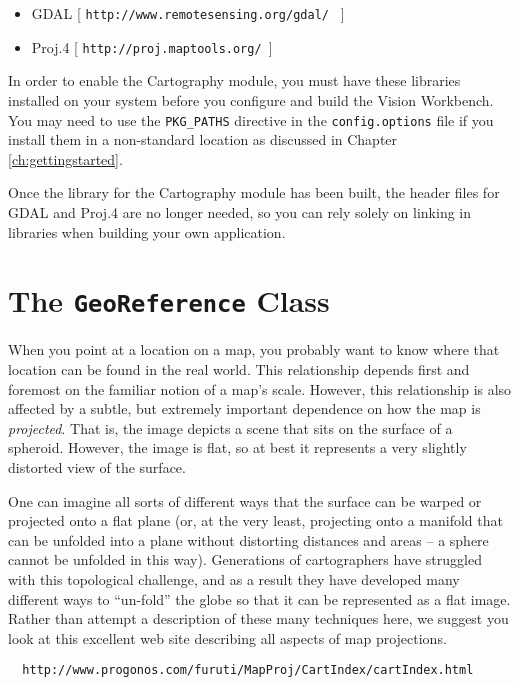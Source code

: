 \begin{itemize}
\item GDAL   [ {\tt http://www.remotesensing.org/gdal/ } ]
\item Proj.4 [ {\tt http://proj.maptools.org/ }]
\end{itemize}

In order to enable the Cartography module, you must have these
libraries installed on your system before you configure and build the
Vision Workbench.  You may need to use the \verb#PKG_PATHS# directive
in the \verb#config.options# file if you install them in a
non-standard location as discussed in Chapter \ref{ch:gettingstarted}.

Once the library for the Cartography module has been built, the header
files for GDAL and Proj.4 are no longer needed, so you can rely solely
on linking in libraries when building your own application.

\section{The {\tt GeoReference} Class}

When you point at a location on a map, you probably want to know where
that location can be found in the real world.  This relationship
depends first and foremost on the familiar notion of a map's scale.
However, this relationship is also affected by a subtle, but extremely
important dependence on how the map is {\em projected}.  That is, the
image depicts a scene that sits on the surface of a spheroid.
However, the image is flat, so at best it represents a very slightly
distorted view of the surface.

One can imagine all sorts of different ways that the surface can be
warped or projected onto a flat plane (or, at the very least,
projecting onto a manifold that can be unfolded into a plane without
distorting distances and areas -- a sphere cannot be unfolded in this
way).  Generations of cartographers have struggled with this
topological challenge, and as a result they have developed many
different ways to ``un-fold'' the globe so that it can be represented
as a flat image.  Rather than attempt a description of these many
techniques here, we suggest you look at this excellent web site
describing all aspects of map projections.

\begin{verbatim}
  http://www.progonos.com/furuti/MapProj/CartIndex/cartIndex.html
\end{verbatim}

